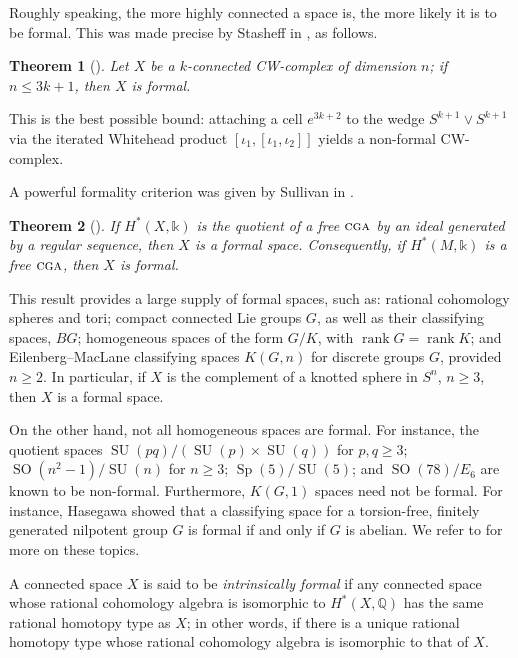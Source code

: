 \documentclass{article}
\numberwithin{equation}{section}
\newtheorem{theorem}{Theorem}[section]
\theoremstyle{definition}
\newcommand{\Q}{\mathbb{Q}}
\renewcommand{\k}{\mathbb{k}}
\newcommand{\cga}{\ensuremath{\textsc{cga}}}
\DeclareMathOperator{\rank}{rank}
\DeclareMathOperator{\Sp}{Sp}
\DeclareMathOperator{\SU}{SU}
\DeclareMathOperator{\SO}{SO}
\begin{document}
Roughly speaking, the more highly connected a space is, the more likely 
it is to be formal.  This was made precise by Stasheff in \cite{Sta83}, as follows.  

\begin{theorem}[\cite{Sta83}]
\label{thm:stasheff}
Let $X$ be a $k$-connected CW-complex of 
dimension $n$; if $n \le 3k+1$, then $X$ is formal.
\end{theorem}

This is the best possible bound:  attaching a cell $e^{3k+2}$ to the 
wedge $S^{k+1}\vee S^{k+1}$ via the iterated Whitehead 
product $[\iota_1,[\iota_1,\iota_2]]$ yields a non-formal 
CW-complex. 

A powerful formality criterion was given by Sullivan in \cite{Sullivan77}.

\begin{theorem}[\cite{Sullivan77}]
\label{thm:regular}
If $H^*(X,\k)$ is the quotient of a free $\cga$ by an ideal generated 
by a regular sequence, then $X$ is a formal space. Consequently, 
if $H^*(M,\k)$ is a free $\cga$, then $X$ is formal.
\end{theorem}

This result provides a large supply of formal spaces, such as: 
rational cohomology spheres and tori; 
compact connected Lie groups $G$, as well as their 
classifying spaces, $BG$; 
homogeneous spaces of the form $G/K$, with 
$\rank G=\rank K$;  and 
Eilenberg--MacLane classifying spaces $K(G, n)$ for 
discrete groups $G$, provided $n\ge 2$.
In particular, if $X$ is the complement of a knotted sphere 
in $S^{n}$, $n\ge 3$, then $X$ is a formal space. 

On the other hand, not all homogeneous spaces are formal. 
For instance, the quotient spaces $\SU(pq)/(\SU(p)\times \SU(q))$ 
for $p,q\ge 3$; $\SO(n^2-1)/\SU(n)$ for $n\ge 3$; 
$\Sp(5)/\SU(5)$; and $\SO(78)/E_6$ are known to be non-formal.
Furthermore, $K(G, 1)$ spaces need not be formal. For instance, 
Hasegawa \cite{Has} showed that a classifying space for a 
torsion-free, finitely generated nilpotent group $G$ is formal 
if and only if $G$ is abelian. We refer to \cite{FOT} for more 
on these topics.

A connected space $X$ is said to be {\em intrinsically formal}\/ if any 
connected space whose rational cohomology algebra is isomorphic to 
$H^*(X,\Q)$ has the same rational homotopy type as $X$; in other 
words, if there is a unique rational homotopy type whose 
rational cohomology algebra is isomorphic to that of $X$. 
\end{document}
